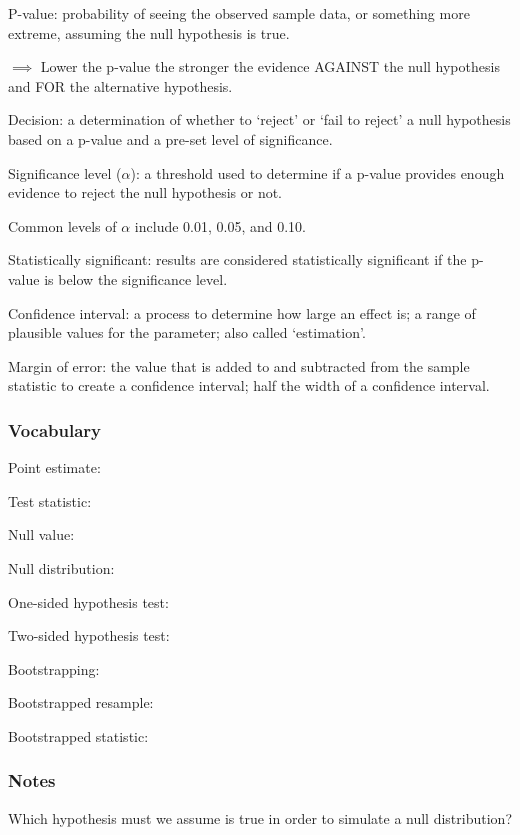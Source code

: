 \documentclass[
]{report}
\newcommand{\rgs}{\vspace{12pt}} %
\newcommand{\rgi}{\hspace{24pt}}  %
\begin{document}
P-value: probability of seeing the observed sample data, or something more extreme, assuming the null hypothesis is true.

\(\implies\) Lower the p-value the stronger the evidence AGAINST the null hypothesis and FOR the alternative hypothesis.

Decision: a determination of whether to `reject' or `fail to reject' a null hypothesis based on a p-value and a pre-set level of significance.

Significance level (\(\alpha\)): a threshold used to determine if a p-value provides enough evidence to reject the null hypothesis or not.

\rgi Common levels of \(\alpha\) include 0.01, 0.05, and 0.10.

Statistically significant: results are considered statistically significant if the p-value is below the significance level.

Confidence interval: a process to determine how large an effect is; a range of plausible values for the parameter; also called `estimation'.

Margin of error: the value that is added to and subtracted from the sample statistic to create a confidence interval; half the width of a confidence interval.

\hypertarget{vocabulary-1}{%
\subsubsection*{Vocabulary}\label{vocabulary-1}}

Point estimate:
\rgs

Test statistic:
\rgs

Null value:
\rgs

Null distribution:
\rgs

One-sided hypothesis test:
\rgs

Two-sided hypothesis test:
\rgs

Bootstrapping:
\rgs

Bootstrapped resample:
\rgs

Bootstrapped statistic:
\rgs

\hypertarget{notes-1}{%
\subsubsection*{Notes}\label{notes-1}}

Which hypothesis must we assume is true in order to simulate a null distribution?
\rgs
\end{document}
